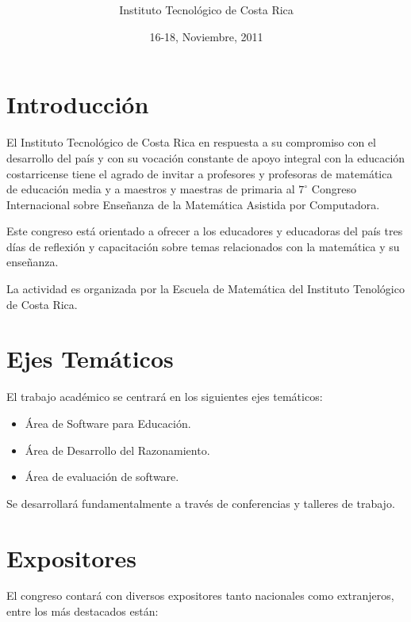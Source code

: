 \documentclass[10pt, notumble, letterpaper]{leaflet}
\title{\vspace*{5cm} }%
\author{Instituto Tecnológico de Costa Rica}
\date{16-18, Noviembre, 2011 }
\begin{document}
\maketitle

\thispagestyle{empty}

\section{Introducción} 

El Instituto Tecnológico de Costa Rica en respuesta a su compromiso con el desarrollo del país y con su vocación constante de apoyo integral con la educación costarricense tiene el agrado de invitar a profesores y profesoras de matemática de educación media y a maestros y maestras de primaria al $7^\circ$ Congreso Internacional sobre Enseñanza de la Matemática Asistida por Computadora.

Este congreso está orientado a ofrecer a los educadores y educadoras del país tres días de reflexión y capacitación sobre temas relacionados con la matemática y su enseñanza.

La actividad es organizada por la Escuela de Matemática del Instituto Tenológico de Costa Rica.

\newpage

\section{Ejes Temáticos}

El trabajo académico se centrará en los siguientes ejes temáticos:

\begin{itemize}
\item Área de Software para Educación.

\item Área de Desarrollo del Razonamiento.

\item Área de evaluación de software.
\end{itemize}

Se desarrollará fundamentalmente a través de conferencias y talleres de trabajo.


\section{Expositores}

El congreso contará con diversos expositores tanto nacionales como extranjeros, entre los más destacados están:
\end{document}
